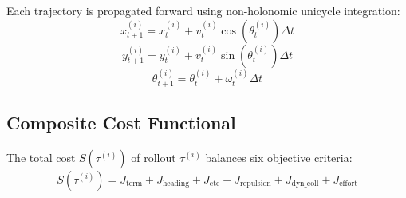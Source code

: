 \documentclass[10pt,a4paper]{article}
\begin{document}
Each trajectory is propagated forward using non-holonomic unicycle integration:
\begin{equation}
x_{t+1}^{(i)} = x_t^{(i)} + v_t^{(i)} \cos(\theta_t^{(i)}) \Delta t
\end{equation}
\begin{equation}
y_{t+1}^{(i)} = y_t^{(i)} + v_t^{(i)} \sin(\theta_t^{(i)}) \Delta t
\end{equation}
\begin{equation}
\theta_{t+1}^{(i)} = \theta_t^{(i)} + \omega_t^{(i)} \Delta t
\end{equation}

\subsection{Composite Cost Functional}
The total cost $S(\tau^{(i)})$ of rollout $\tau^{(i)}$ balances six objective criteria:
\begin{equation}
S(\tau^{(i)}) = J_{\text{term}} + J_{\text{heading}} + J_{\text{cte}} + J_{\text{repulsion}} + J_{\text{dyn\_coll}} + J_{\text{effort}}
\end{equation}
\end{document}

